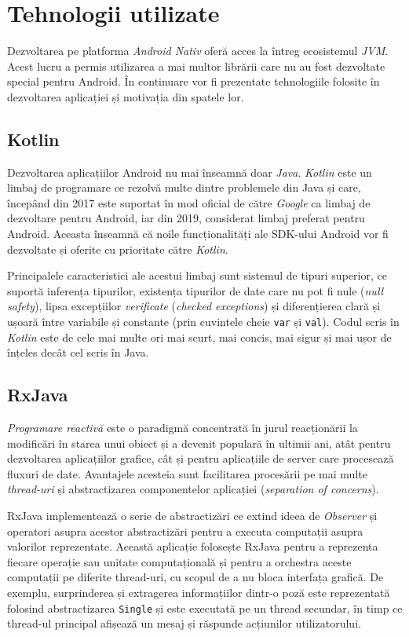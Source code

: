 \section{Tehnologii utilizate}

Dezvoltarea pe platforma \emph{Android Nativ} oferă acces la întreg ecosistemul \emph{JVM}. Acest lucru a permis utilizarea a mai multor librării care nu au fost dezvoltate special pentru Android. În continuare vor fi prezentate tehnologiile folosite în dezvoltarea aplicației și motivația din spatele lor.

\subsection{Kotlin}

Dezvoltarea aplicațiilor Android nu mai înseamnă doar \emph{Java}. \emph{Kotlin} este un limbaj de programare ce rezolvă multe dintre problemele din Java și care, începând din 2017 este suportat în mod oficial de către \emph{Google} ca limbaj de dezvoltare pentru Android, iar din 2019, considerat limbaj preferat pentru Android. Aceasta înseamnă că noile funcționalități ale SDK-ului Android vor fi dezvoltate și oferite cu prioritate către \emph{Kotlin}.

Principalele caracteristici ale acestui limbaj sunt sistemul de tipuri superior, ce suportă inferența tipurilor, existența tipurilor de date care nu pot fi nule (\emph{null safety}), lipsa excepțiilor \emph{verificate} (\emph{checked exceptions}) și diferențierea clară și ușoară între variabile și constante (prin cuvintele cheie \texttt{var} și \texttt{val}). Codul scris în \emph{Kotlin} este de cele mai multe ori mai scurt, mai concis, mai sigur și mai ușor de înțeles decât cel scris în Java.

\subsection{RxJava}

\emph{Programare reactivă} \cite{ReactiveProgramming} este o paradigmă concentrată în jurul reacționării la modificări în starea unui obiect și a devenit populară în ultimii ani, atât pentru dezvoltarea aplicațiilor grafice, cât și pentru aplicațiile de server care procesează fluxuri de date. Avantajele acesteia sunt facilitarea procesării pe mai multe \emph{thread-uri} și abstractizarea componentelor aplicației (\emph{separation of concerns}).

RxJava implementează o serie de abstractizări ce extind ideea de \emph{Observer}\cite{ObseverPattern} și operatori asupra acestor abstractizări pentru a executa computații asupra valorilor reprezentate. Această aplicație folosește RxJava pentru a reprezenta fiecare operație sau unitate computațională și pentru a orchestra aceste computații pe diferite thread-uri, cu scopul de a nu bloca interfața grafică. De exemplu, surprinderea și extragerea informațiilor dintr-o poză este reprezentată folosind abstractizarea \texttt{Single} și este executată pe un thread secundar, în timp ce thread-ul principal afișează un mesaj și răspunde acțiunilor utilizatorului.

